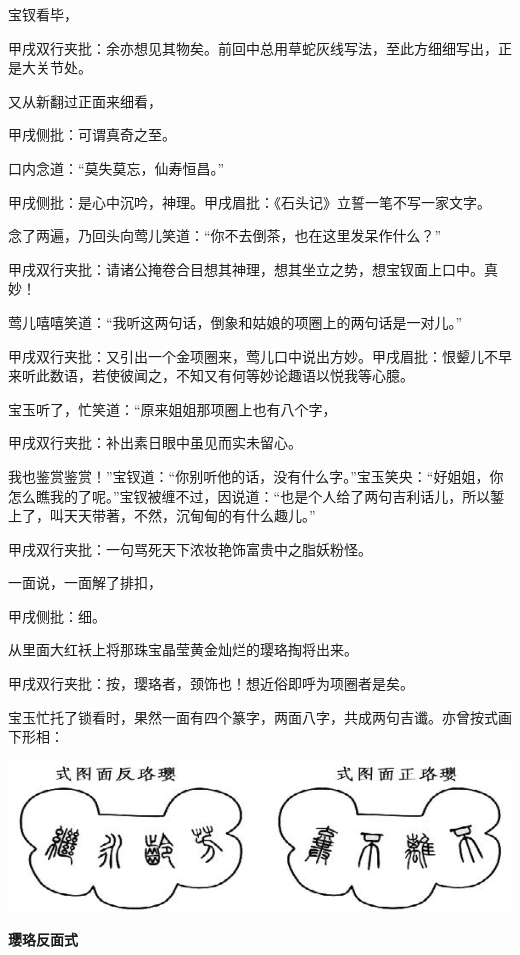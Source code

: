 \begin{parag}
    宝钗看毕，\begin{note}甲戌双行夹批：余亦想见其物矣。前回中总用草蛇灰线写法，至此方细细写出，正是大关节处。\end{note}又从新翻过正面来细看，\begin{note}甲戌侧批：可谓真奇之至。\end{note}口内念道：“莫失莫忘，仙寿恒昌。”\begin{note}甲戌侧批：是心中沉吟，神理。甲戌眉批：《石头记》立誓一笔不写一家文字。\end{note}念了两遍，乃回头向莺儿笑道：“你不去倒茶，也在这里发呆作什么？”\begin{note}甲戌双行夹批：请诸公掩卷合目想其神理，想其坐立之势，想宝钗面上口中。真妙！\end{note}莺儿嘻嘻笑道：“我听这两句话，倒象和姑娘的项圈上的两句话是一对儿。”\begin{note}甲戌双行夹批：又引出一个金项圈来，莺儿口中说出方妙。甲戌眉批：恨颦儿不早来听此数语，若使彼闻之，不知又有何等妙论趣语以悦我等心臆。\end{note}宝玉听了，忙笑道：“原来姐姐那项圈上也有八个字，\begin{note}甲戌双行夹批：补出素日眼中虽见而实未留心。\end{note}我也鉴赏鉴赏！”宝钗道：“你别听他的话，没有什么字。”宝玉笑央：“好姐姐，你怎么瞧我的了呢。”宝钗被缠不过，因说道：“也是个人给了两句吉利话儿，所以錾上了，叫天天带著，不然，沉甸甸的有什么趣儿。”\begin{note}甲戌双行夹批：一句骂死天下浓妆艳饰富贵中之脂妖粉怪。\end{note}一面说，一面解了排扣，\begin{note}甲戌侧批：细。\end{note}从里面大红袄上将那珠宝晶莹黄金灿烂的璎珞掏将出来。\begin{note}甲戌双行夹批：按，璎珞者，颈饰也！想近俗即呼为项圈者是矣。\end{note}宝玉忙托了锁看时，果然一面有四个篆字，两面八字，共成两句吉谶。亦曾按式画下形相：
\end{parag}

\includegraphics[]{8-2}
\begin{parag}
    \textbf{璎珞反面式}
\end{parag}



